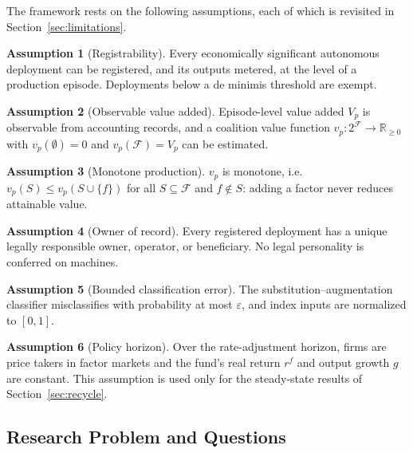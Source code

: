 \documentclass[journal]{IEEEtran}
\theoremstyle{plain}
\theoremstyle{definition}
\newtheorem{assumption}{Assumption}
\begin{document}
The framework rests on the following assumptions, each of which is revisited in Section~\ref{sec:limitations}.

\begin{assumption}[Registrability]
\label{as:reg}
Every economically significant autonomous deployment can be registered, and its outputs metered, at the level of a production episode. Deployments below a de minimis threshold are exempt.
\end{assumption}

\begin{assumption}[Observable value added]
\label{as:va}
Episode-level value added $V_p$ is observable from accounting records, and a coalition value function $v_p:2^{\mathcal{F}}\to\mathbb{R}_{\ge 0}$ with $v_p(\emptyset)=0$ and $v_p(\mathcal{F})=V_p$ can be estimated.
\end{assumption}

\begin{assumption}[Monotone production]
\label{as:mono}
$v_p$ is monotone, i.e. $v_p(S)\le v_p(S\cup\{f\})$ for all $S\subseteq\mathcal{F}$ and $f\notin S$: adding a factor never reduces attainable value.
\end{assumption}

\begin{assumption}[Owner of record]
\label{as:owner}
Every registered deployment has a unique legally responsible owner, operator, or beneficiary. No legal personality is conferred on machines.
\end{assumption}

\begin{assumption}[Bounded classification error]
\label{as:class}
The substitution--augmentation classifier misclassifies with probability at most $\varepsilon$, and index inputs are normalized to $[0,1]$.
\end{assumption}

\begin{assumption}[Policy horizon]
\label{as:horizon}
Over the rate-adjustment horizon, firms are price takers in factor markets and the fund's real return $r^{f}$ and output growth $g$ are constant. This assumption is used only for the steady-state results of Section~\ref{sec:recycle}.
\end{assumption}

\subsection{Research Problem and Questions}
\end{document}
